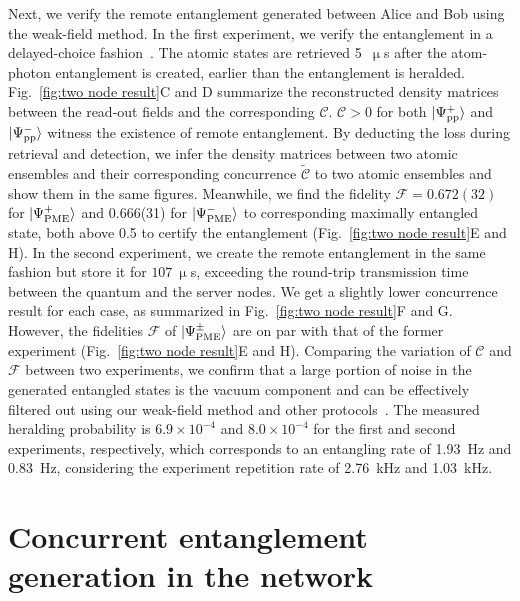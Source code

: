 \documentclass[aps,reprint,showpacs,superscriptaddress]{revtex4-2}
\begin{document}
Next, we verify the remote entanglement generated between Alice and Bob using the weak-field method. In the first experiment, we verify the entanglement in a delayed-choice fashion~\cite{ma2012a}. The atomic states are retrieved 5~$\upmu$s after the atom-photon entanglement is created, earlier than the entanglement is heralded. Fig.~\ref{fig:two node result}C and D summarize the reconstructed density matrices between the read-out fields and the corresponding $\mathcal{C}$. $\mathcal{C}>0$ for both $\ket{\Psi^+_{\textrm{pp}}}$ and $\ket{\Psi^-_{\textrm{pp}}}$ witness the existence of remote entanglement. By deducting the loss during retrieval and detection, we infer the density matrices between two atomic ensembles and their corresponding concurrence $\tilde{\mathcal{C}}$ to two atomic ensembles and show them in the same figures. Meanwhile, we find the fidelity $\mathcal{F}=0.672(32)$ for $\ket{\Psi_{\textrm{PME}}^{+}}$ and 0.666(31) for $\ket{\Psi_{\textrm{PME}}^{-}}$ to corresponding maximally entangled state, both above 0.5 to certify the entanglement (Fig.~\ref{fig:two node result}E and H). In the second experiment, we create the remote entanglement in the same fashion but store it for $107~\upmu$s, exceeding the round-trip transmission time between the quantum and the server nodes. We get a slightly lower concurrence result for each case, as summarized in Fig.~\ref{fig:two node result}F and G. However, the fidelities $\mathcal{F}$ of $\ket{\Psi_{\textrm{PME}}^{\pm}}$ are on par with that of the former experiment (Fig.~\ref{fig:two node result}E and H). Comparing the variation of $\mathcal{C}$ and $\mathcal{F}$ between two experiments, we confirm that a large portion of noise in the generated entangled states is the vacuum component and can be effectively filtered out using our weak-field method and other protocols~\cite{duan2001}. The measured heralding probability is $6.9\times 10^{-4}$ and $8.0\times 10^{-4}$ for the first and second experiments, respectively, which corresponds to an entangling rate of 1.93~Hz and 0.83~Hz, considering the experiment repetition rate of 2.76~kHz and 1.03~kHz.

\section*{Concurrent entanglement generation in the network}
\end{document}
